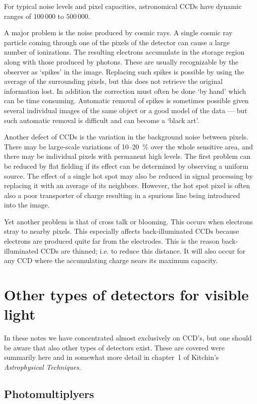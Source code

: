 For typical noise levels and pixel capacities, astronomical CCDs have dynamic
ranges of $100\,000$ to $500\,000$.

A major problem is the noise produced by cosmic rays. A single cosmic ray
particle coming through one of the pixels of the detector can cause a large
number of ionizations. The resulting electrons accumulate in the storage 
region along with those produced by photons. These are usually recognizable
by the observer as `spikes' in the image. Replacing such spikes is possible
by using the average of the surrounding pixels, but this does not retrieve 
the original information lost. In addition the correction must often be done
`by hand' which can be time consuming. Automatic removal of spikes is 
sometimes possible given several individual images of the same object or a 
good model of the data --- but such automatic removal is difficult and 
can become a `black art'. 

Another defect of CCDs is the variation in the background noise between 
pixels. There may be large-scale variations of 10--20~\% over the whole
sensitive area, and there may be individual pixels with permanent high levels.
The first problem can be reduced by flat fielding if its effect can be 
determined by observing a uniform source. The effect of a single hot spot
may also be reduced in signal processing by replacing it with an average of
its neighbors. However, the hot spot pixel is often also a poor transporter 
of charge resulting in a spurious line being introduced into the image.

Yet another problem is that of cross talk or blooming. This occurs when 
electrons stray to nearby pixels. This especially affects back-illuminated 
CCDs because electrons are produced quite far from the electrodes. This
is the reason back-illuminated CCDs are thinned; i.e. to reduce this 
distance. It will also occur for any CCD where the accumulating charge nears
its maximum capacity. 

\section{Other types of detectors for visible light}

In these notes we have concentrated almost exclusively on CCD's, but one should
be aware that also other types of detectors exist. These are covered were
summarily here and in somewhat more detail in chapter~1 of Kitchin's 
{\it Astrophysical Techniques}.

\subsection{Photomultiplyers}

